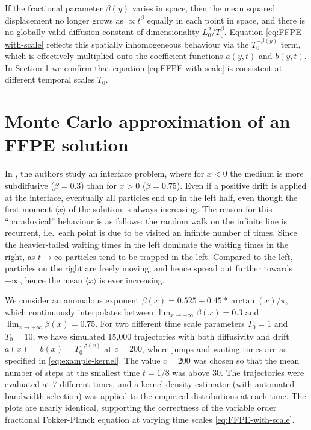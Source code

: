 \documentclass[a4paper,12pt]{elsarticle}
\numberwithin{equation}{section}
\theoremstyle{plain}
\theoremstyle{definition}
\theoremstyle{remark}
\numberwithin{equation}{section}
\newcommand{\1}{\mathbf 1}
\begin{document}
If the fractional parameter $\beta(y)$ varies in space, then the mean squared displacement no longer grows as $\propto t^\beta$ equally in each point in space, and 
there is no globally valid diffusion constant of dimensionality $L_0^2 / T_0^\beta$.  
Equation
\eqref{eq:FFPE-with-scale} reflects this spatially inhomogeneous behaviour
via the $T_0^{-\beta(y)}$ term, which is effectively multiplied onto the
coefficient functions $a(y,t)$ and $b(y,t)$.  In Section \ref{sec:examples}
we confirm that equation \eqref{eq:FFPE-with-scale} is consistent at 
different temporal scales $T_0$. 


\section{Monte Carlo approximation of an FFPE solution}
\label{sec:examples}

In \citep{Korabel2010}, the authors study an interface problem, where for $x<0$ the medium is more subdiffusive ($\beta = 0.3$) than for $x>0$ ($\beta = 0.75$).  Even if a positive drift is applied at the interface, eventually all particles end up in the left half, even though the first moment $\langle x \rangle$ of the solution is always increasing. The reason for this ``paradoxical'' behaviour is as follows: the random walk on the infinite line is recurrent, i.e.\ each point is due to be visited an infinite number of times. Since the heavier-tailed waiting times in the left dominate the waiting times in the right, as $t \to \infty$ particles tend to be trapped in the left. Compared to the left, particles on the right are freely moving, and hence spread out further towards $+\infty$, hence the mean $\langle x \rangle$ is ever increasing. 

We consider an anomalous exponent $\beta(x) = 0.525 + 0.45 * \arctan(x)/ \pi$, which continuously interpolates between $\lim_{x \to -\infty} \beta(x) = 0.3$ 
and $\lim_{x \to +\infty} \beta(x) = 0.75$.
For two different time scale parameters $T_0 = 1$ and $T_0 = 10$, we have simulated 15,000 trajectories \citep{var-order-MC} with both diffusivity and drift $a(x) = b(x) = T_0^{-\beta(x)}$
at $c = 200$, where jumps and waiting times are as specified in \eqref{eq:example-kernel}. The value $c = 200$ was chosen so that the mean number of steps at the smallest time $t = 1/8$ was above $30$. The trajectories were evaluated at 7 different times, and a kernel density estimator (with automated bandwidth selection) was applied
to the empirical distributions at each time.  The plots are nearly identical, supporting the correctness of the variable order fractional Fokker-Planck equation at varying time scales \eqref{eq:FFPE-with-scale}. 
\end{document}
